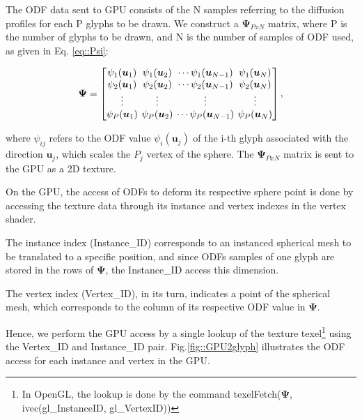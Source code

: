 \documentclass[twoside,twocolumn,10pt]{article}
\begin{document}
The ODF data sent to GPU consists of the N samples referring to the diffusion profiles for each P glyphs to be drawn. We construct a $\bm{\Psi}_{PxN}$ matrix, where P is the number of glyphs to be drawn, and N is the number of samples of ODF used, as given in Eq. \ref{eq::Psi}:

\begin{equation}
\label{eq::Psi}
\bm{\Psi} = 
\begingroup %
\setlength\arraycolsep{2pt}
\begin{bmatrix} 
    \psi_1(\bm{u}_1) & \psi_1(\bm{u}_2) & \cdots \psi_1(\bm{u}_{N-1}) & \psi_1(\bm{u}_{N})  \\    
     \psi_2(\bm{u}_1)& \psi_2(\bm{u}_2) & \cdots \psi_2(\bm{u}_{N-1}) & \psi_2(\bm{u}_{N}) \\
    \vdots & \vdots & \vdots & \vdots  \\    
     \psi_P(\bm{u}_1)&\psi_P(\bm{u}_2) & \cdots \psi_P(\bm{u}_{N-1}) & \psi_P(\bm{u}_{N})
\end{bmatrix}, 
\endgroup
\end{equation}

where $\psi_{ij}$ refers to the ODF value $\psi_i(\bm{u}_j)$ of the i-th glyph associated with the direction $\bm{u}_j$, which scales the $P_j$ vertex of the sphere. The $\bm{\Psi}_{PxN}$ matrix is sent to the GPU as a 2D texture.

On the GPU, the access of ODFs to deform its respective sphere point is done by accessing the texture data through its instance and vertex indexes in the vertex shader.

The instance index (Instance\_ID) corresponds to an instanced spherical mesh to be translated to a specific position, and since ODFs samples of one glyph are stored in the rows of $\bm{\Psi}$, the Instance\_ID access this dimension.


The vertex index (Vertex\_ID), in its turn, indicates a point of the spherical mesh, which corresponds to the column of its respective ODF value in $\bm{\Psi}$.

Hence, we perform the GPU access by a single lookup of the texture texel\footnote{In OpenGL, the lookup is done by the command texelFetch($\bm{\Psi}$, ivec(gl\_InstanceID, gl\_VertexID))} using the Vertex\_ID and Instance\_ID pair. Fig.\ref{fig::GPU2glyph} illustrates the ODF access for each instance and vertex in the GPU.
\end{document}
